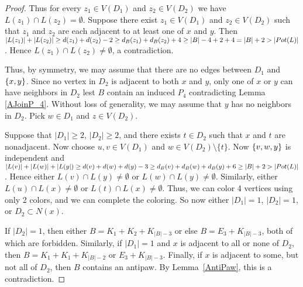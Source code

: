 \begin{proof}
Thus for every $z_1 \in V(D_1)$ and $z_2 \in V(D_2)$ we have $L(z_1) \cap L(z_2) = \emptyset$. 
Suppose there exist $z_1\in V(D_1)$ and $z_2\in V(D_2)$ such that $z_1$ and
$z_2$ are each adjacent to at least one of $x$ and $y$.
Then $\left|L(z_1)\right| + \left|L(z_2)\right| \geq d(z_1) + d(z_2) - 2 \geq d_B(z_1) + d_B(z_2) + 4 \geq \left|B\right| - 4 + 2 + 4 = \left|B\right| + 2 > \left|Pot(L)\right|$.  Hence $L(z_1) \cap L(z_2) \neq \emptyset$, a contradiction.

Thus, by symmetry, we may assume that there are no edges between $D_1$ and $\left\{ x, y \right\}$.  Since no vertex in $D_2$ is adjacent to both $x$ and $y$, only one of $x$ or $y$ can have neighbors in $D_2$ lest $B$ contain an induced $P_4$ contradicting Lemma \ref{AJoinP_4}. Without loss of generality, we may assume that $y$ has no neighbors in $D_2$. Pick $w \in D_1$ and $z \in V(D_2)$.  

Suppose that $|D_1|\ge 2$, $|D_2|\ge 2$, and there exists $t\in D_2$ such that
$x$ and $t$ are nonadjacent.  Now choose $u,v\in V(D_1)$ and $w\in
V(D_2)\setminus\{t\}$.  
Now $\left\{ v, w, y \right\}$ is independent and $\left|L(v)\right| + \left|L(w)\right| + \left|L(y\right|) \geq d(v) + d(w) + d(y) - 3 \geq d_B(v) + d_B(w) + d_B(y) + 6 \geq \left|B\right| + 2 > \left|Pot(L)\right|$. Hence either $L(v) \cap L(y) \neq \emptyset$ or $L(w) \cap L(y) \neq \emptyset$.  
Similarly, either $L(u)\cap L(x) \neq \emptyset$ or $L(t)\cap L(x)\neq
\emptyset$.  Thus, we can color 4 vertices using only 2 colors, and we can
complete the coloring.
So now either $|D_1|=1$, $|D_2|=1$, or $D_2\subset N(x)$.

If $|D_2|=1$, then either $B=K_1+K_2+K_{|B|-3}$ or else $B=E_3+K_{|B|-3}$, both
of which are forbidden.  Similarly, if $|D_1|=1$ and $x$ is adjacent to all or
none of $D_2$, then $B=K_1+K_1+K_{|B|-2}$ or $E_3+K_{|B|-3}$.
Finally, if $x$ is adjacent to some, but not all of $D_2$, then $B$ contains an
antipaw.  By Lemma~\ref{AntiPaw}, this is a contradiction.


\end{proof}
